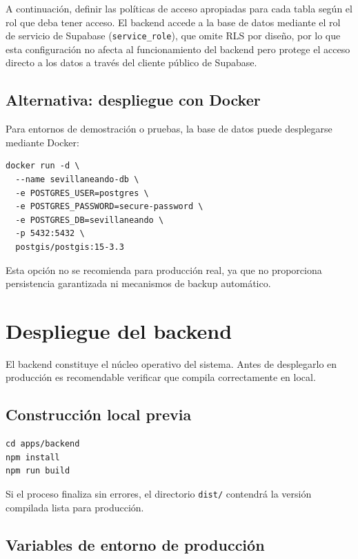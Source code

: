 A continuación, definir las políticas de acceso apropiadas para cada tabla según el rol que deba tener acceso. El backend accede a la base de datos mediante el rol de servicio de Supabase (\texttt{service\_role}), que omite RLS por diseño, por lo que esta configuración no afecta al funcionamiento del backend pero protege el acceso directo a los datos a través del cliente público de Supabase.

\subsection{Alternativa: despliegue con Docker}

Para entornos de demostración o pruebas, la base de datos puede desplegarse mediante Docker:

\begin{lstlisting}
docker run -d \
  --name sevillaneando-db \
  -e POSTGRES_USER=postgres \
  -e POSTGRES_PASSWORD=secure-password \
  -e POSTGRES_DB=sevillaneando \
  -p 5432:5432 \
  postgis/postgis:15-3.3
\end{lstlisting}

Esta opción no se recomienda para producción real, ya que no proporciona persistencia garantizada ni mecanismos de backup automático.

\section{Despliegue del backend}

El backend constituye el núcleo operativo del sistema. Antes de desplegarlo en producción es recomendable verificar que compila correctamente en local.

\subsection{Construcción local previa}

\begin{lstlisting}
cd apps/backend
npm install
npm run build
\end{lstlisting}

Si el proceso finaliza sin errores, el directorio \texttt{dist/} contendrá la versión compilada lista para producción.

\subsection{Variables de entorno de producción}

